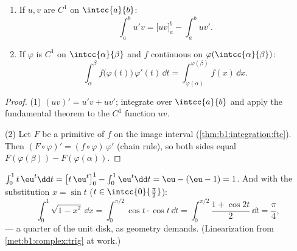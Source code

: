 \begin{theorem}\label{thm:b1:integration:parts}
\begin{enumerate}
  \item If $u, v$ are $C^1$ on $\intcc{a}{b}$:
        \[
        \int_a^b u'v = \bigl[uv\bigr]_a^b - \int_a^b uv' .
        \]
  \item If $\varphi$ is $C^1$ on $\intcc{\alpha}{\beta}$ and $f$
        continuous on $\varphi(\intcc{\alpha}{\beta})$:
        \[
        \int_{\alpha}^{\beta} f\bigl(\varphi(t)\bigr)\,\varphi'(t)\,
        \dd t = \int_{\varphi(\alpha)}^{\varphi(\beta)} f(x)\, \dd x .
        \]
\end{enumerate}
\end{theorem}

\begin{proof}
(1) $(uv)' = u'v + uv'$; integrate over $\intcc{a}{b}$ and apply the
fundamental theorem to the $C^1$ function $uv$.

(2) Let $F$ be a primitive of $f$ on the image interval
(\cref{thm:b1:integration:ftc}). Then $(F \circ \varphi)' = (f
\circ \varphi)\,\varphi'$ (chain rule), so both sides equal
$F(\varphi(\beta)) - F(\varphi(\alpha))$.
\end{proof}

\begin{example}\label{ex:b1:integration:parts}
$\int_0^1 t\,\eu^t \dd t = \bigl[t\,\eu^t\bigr]_0^1 - \int_0^1
\eu^t\dd t = \eu - (\eu - 1) = 1$. And with the substitution $x =
\sin t$ ($t \in \intcc{0}{\frac\pi2}$):
\[
\int_0^1 \sqrt{1 - x^2}\, \dd x
= \int_0^{\pi/2} \cos t \cdot \cos t \, \dd t
= \int_0^{\pi/2} \frac{1 + \cos 2t}{2}\, \dd t = \frac\pi4 ,
\]
--- a quarter of the unit disk, as geometry demands. (Linearization
from \cref{met:b1:complex:trig} at work.)
\end{example}

